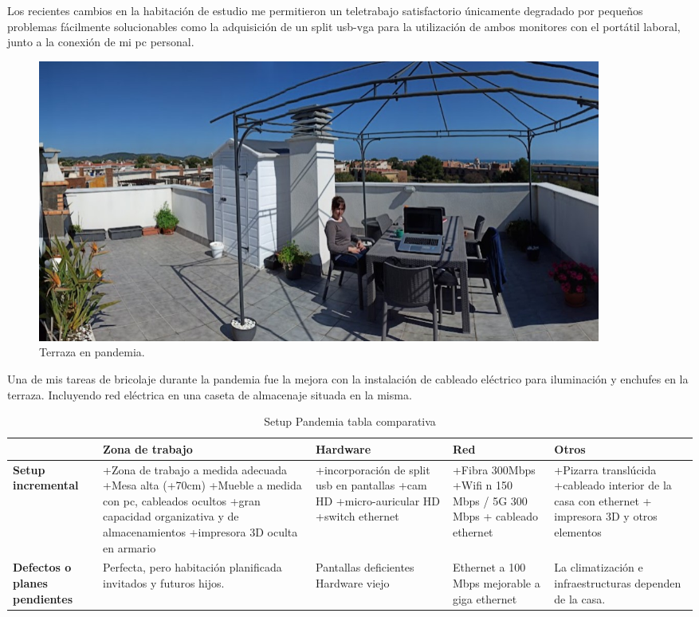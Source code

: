 Los recientes cambios en la habitación de estudio me permitieron un teletrabajo satisfactorio únicamente degradado por pequeños problemas fácilmente solucionables como la adquisición de un split usb-vga para la utilización de ambos monitores con el portátil laboral, junto a la conexión de mi pc personal.

\begin{figure}[htb]
\begin{center}
\includegraphics[width=0.9\textwidth]{./figuras/terraza_cero.jpg}
\caption{Terraza en pandemia.}
\label{F:terraza_cero}
\end{center}
\end{figure}

Una de mis tareas de bricolaje durante la pandemia fue la mejora con la instalación de cableado eléctrico para iluminación y enchufes en la terraza. Incluyendo red eléctrica en una caseta de almacenaje situada en la misma. 

\begin{table}[htb]
    \centering
    \caption{Setup Pandemia tabla comparativa}
    \label{T:comp_setup_pandemia}
    \begin{tabular}{|p{2cm}|p{3cm}|p{2.75cm}|p{2.75cm}|p{2.75cm}|}
    \hline   \hline
        ~ & \textbf{Zona de trabajo} & \textbf{Hardware} & \textbf{Red} & \textbf{Otros} \\ \hline
        \textbf{Setup incremental} & +Zona de trabajo a medida adecuada +Mesa alta (+70cm) +Mueble a medida con pc, cableados ocultos +gran capacidad organizativa y de almacenamientos +impresora 3D oculta en armario & +incorporación de split usb en pantallas +cam HD +micro-auricular HD +switch ethernet & +Fibra 300Mbps +Wifi n 150 Mbps / 5G 300 Mbps + cableado ethernet & +Pizarra translúcida +cableado interior de la casa con ethernet + impresora 3D y otros elementos \\ \hline
        \textbf{Defectos o planes pendientes} & Perfecta, pero habitación planificada invitados y futuros hijos.  & Pantallas deficientes Hardware viejo & Ethernet a 100 Mbps mejorable a giga ethernet & La climatización e infraestructuras dependen de la casa. \\ \hline
    \end{tabular}
\end{table}

